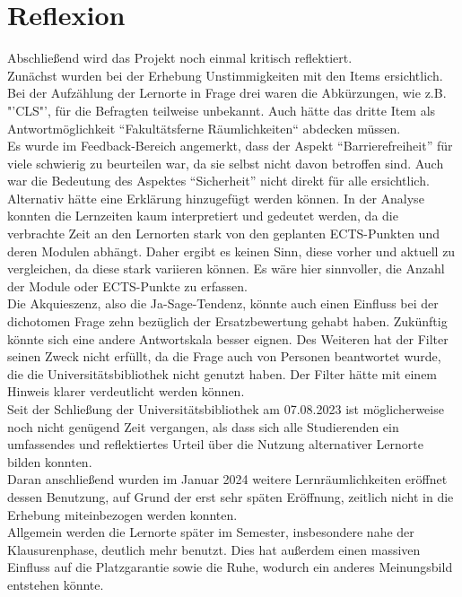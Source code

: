 \documentclass[11pt, a4paper]{article}
\begin{document}
\section{Reflexion}
Abschließend wird das Projekt noch einmal kritisch reflektiert. \\
Zunächst wurden bei der Erhebung Unstimmigkeiten mit den Items ersichtlich.
Bei der Aufzählung der Lernorte in Frage drei waren die Abkürzungen, wie z.B. "'CLS"', für die Befragten teilweise unbekannt. Auch hätte das dritte Item als Antwortmöglichkeit “Fakultätsferne Räumlichkeiten“ abdecken müssen. \\
Es wurde im Feedback-Bereich angemerkt, dass der Aspekt “Barrierefreiheit” für viele schwierig zu beurteilen war, da sie selbst nicht davon betroffen sind. Auch war die Bedeutung des Aspektes “Sicherheit” nicht direkt für alle ersichtlich. Alternativ hätte eine Erklärung hinzugefügt werden können.
In der Analyse konnten die Lernzeiten kaum interpretiert und gedeutet werden, da die verbrachte Zeit an den Lernorten stark von den geplanten ECTS-Punkten und deren Modulen abhängt. Daher ergibt es keinen Sinn, diese vorher und aktuell zu vergleichen, da diese stark variieren können. Es wäre hier sinnvoller, die Anzahl der Module oder ECTS-Punkte zu erfassen.\\
Die Akquieszenz, also die Ja-Sage-Tendenz, könnte auch einen Einfluss bei der dichotomen Frage zehn bezüglich der Ersatzbewertung gehabt haben. Zukünftig könnte sich eine andere Antwortskala besser eignen. Des Weiteren hat der Filter seinen Zweck nicht erfüllt, da die Frage auch von Personen beantwortet wurde, die die Universitätsbibliothek nicht genutzt haben. Der Filter hätte mit einem Hinweis klarer verdeutlicht werden können.\\
Seit der Schließung der Universitätsbibliothek am 07.08.2023 ist möglicherweise noch nicht genügend Zeit vergangen, als dass sich alle Studierenden ein umfassendes und reflektiertes Urteil über die Nutzung alternativer Lernorte bilden konnten. \\
Daran anschließend wurden im Januar 2024 weitere Lernräumlichkeiten eröffnet dessen Benutzung, auf Grund der erst sehr späten Eröffnung, zeitlich nicht in die Erhebung miteinbezogen werden konnten. \\
Allgemein werden die Lernorte später im Semester, insbesondere nahe der Klausurenphase, deutlich mehr benutzt. Dies hat außerdem einen massiven Einfluss auf die Platzgarantie sowie die Ruhe, wodurch ein anderes Meinungsbild entstehen könnte.\\
\end{document}
